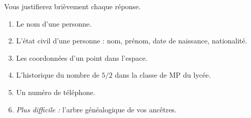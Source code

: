 \exer{}
\setcounter{numques}{0}

Vous justifierez brièvement chaque réponse. 

\begin{enumerate}%
  \item Le nom d'une personne.
  \item L'état civil d'une personne : nom, prénom, date de naissance, nationalité.
  \item Les coordonnées d'un point dans l'espace.
  \item L'historique du nombre de $5/2$ dans la classe de MP du lycée. 
  \item Un numéro de téléphone. 
  \item \emph{Plus difficile :} l'arbre généalogique de vos ancêtres. 
\end{enumerate}
